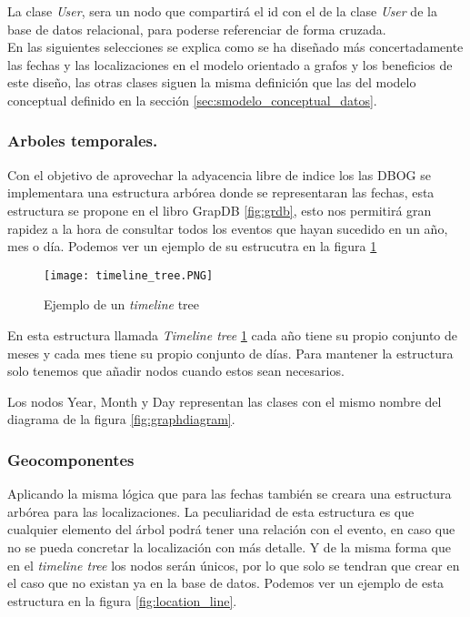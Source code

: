 La clase \textit{User}, sera un nodo que compartirá el id con el de la clase \textit{User} de la base de datos relacional, para poderse referenciar de forma cruzada.\\
En las siguientes selecciones se explica como se ha diseñado más concertadamente las fechas y las localizaciones en el modelo orientado a grafos y los beneficios de este diseño, las otras clases siguen la misma definición que las del modelo conceptual definido en la sección \ref{sec:smodelo_conceptual_datos}.
\newpage
\subsubsection{Arboles temporales.}
Con el objetivo de aprovechar la adyacencia libre de indice los las DBOG se implementara una estructura arbórea donde se representaran las fechas, esta estructura se propone en el libro GrapDB \ref{fig:grdb}, esto nos permitirá gran rapidez a la hora de consultar todos los eventos que hayan sucedido en un año, mes o día. Podemos ver un ejemplo de su estrucutra en la figura \ref{fig:timeline}

\begin{figure}[ht!]
\center
\texttt{[image: timeline\_tree.PNG]}
\caption{Ejemplo de un \textit{timeline} tree}
\label{fig:timeline}
\end{figure}

En esta estructura llamada \textit{Timeline tree} \ref{fig:timeline} cada año tiene su propio conjunto de meses y cada mes tiene su propio conjunto de días. Para mantener la estructura solo tenemos que añadir nodos cuando estos sean necesarios.

Los nodos Year, Month y Day representan las clases con el mismo nombre del diagrama de la figura \ref{fig:graphdiagram}.
\newpage
\subsubsection{Geocomponentes}
Aplicando la misma lógica que para las fechas también se creara una estructura arbórea para las localizaciones. La peculiaridad de esta estructura es que cualquier elemento del árbol podrá tener una relación con el evento, en caso que no se pueda concretar la localización con más detalle. Y de la misma forma que en el \textit{timeline tree} los nodos serán únicos, por lo que solo se tendran que crear en el caso que no existan ya en la base de datos. Podemos ver un ejemplo de esta estructura en la figura \ref{fig:location_line}.

